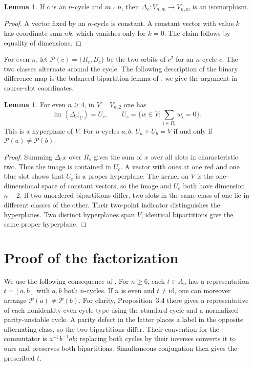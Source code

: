 \documentclass[11pt,letterpaper]{article}
\theoremstyle{definition}
\newtheorem{lemma}[theorem]{Lemma}
\theoremstyle{remark}
\newcommand{\im}{\operatorname{im}}
\newcommand{\id}{\mathrm{id}}
\newcommand{\cl}[2]{[#1,#2]}
\begin{document}
\begin{lemma}\label{lem:corner}
If \(c\) is an \(n\)-cycle and \(m\nmid n\), then
\(\Delta_c:V_{n,m}\longrightarrow V_{n,m}\) is an isomorphism.
\end{lemma}
\begin{proof}
A vector fixed by an \(n\)-cycle is constant. A constant vector with value
\(k\) has coordinate sum \(nk\), which vanishes only for \(k=0\).
The claim follows by equality of dimensions.
\end{proof}

For even \(n\), let \(\mathcal P(c)=\{R_c,B_c\}\) be the two orbits of
\(c^2\) for an \(n\)-cycle \(c\). The two classes alternate around the
cycle. The following description of the binary difference map is the
balanced-bipartition lemma of \cite[Lemmas~5.4 and~5.6]{bbw}; we give the
argument in source-slot coordinates.

\begin{lemma}\label{lem:edge}
For even \(n\ge4\), in \(V=V_{n,2}\) one has
\[
 \im(\Delta_c|_V)=U_c,\qquad
 U_c=\{w\in V:\textstyle\sum_{i\in R_c}w_i=0\}.
\]
This is a hyperplane of \(V\). For \(n\)-cycles \(a,b\),
\(U_a+U_b=V\) if and only if \(\mathcal P(a)\ne\mathcal P(b)\).
\end{lemma}
\begin{proof}
Summing \(\Delta_c x\) over \(R_c\) gives the sum of \(x\) over all
slots in characteristic two. Thus the image is contained in \(U_c\).
A vector with ones at one red and one blue slot shows that \(U_c\) is a
proper hyperplane. The kernel on \(V\) is the one-dimensional space of
constant vectors, so the image and \(U_c\) both have dimension \(n-2\).
If two unordered bipartitions differ, two slots in the same class of
one lie in different classes of the other. Their two-point indicator
distinguishes the hyperplanes. Two distinct hyperplanes span \(V\);
identical bipartitions give the same proper hyperplane.
\end{proof}

\section{Proof of the factorization}\label{sec:proof}

We use the following consequence of \cite[Theorem~3.1 and
Proposition~3.4]{bbw}. For \(n\ge6\), each \(t\in A_n\) has a
representation \(t=\cl{a}{b}\) with \(a,b\) both \(n\)-cycles. If \(n\)
is even and \(t\ne\id\), one can moreover arrange
\(\mathcal P(a)\ne\mathcal P(b)\). For clarity, Proposition~3.4 there
gives a representative of each nonidentity even cycle type using the
standard cycle and a normalized parity-unstable cycle. A parity defect
in the latter places a label in the opposite alternating class, so the
two bipartitions differ. Their convention for the commutator is
\(a^{-1}b^{-1}ab\); replacing both cycles by their inverses converts it
to ours and preserves both bipartitions. Simultaneous conjugation then
gives the prescribed \(t\).
\end{document}
